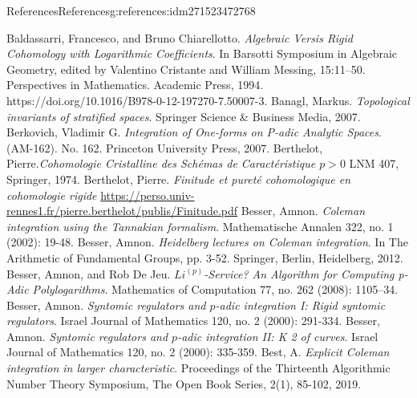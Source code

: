 \documentclass[oneside,10pt,]{book}
\numberwithin{equation}{section}
\newcommand{\gt}{>}
\begin{document}
\begin{references-chapter-numberless}{References}{}{References}{}{}{g:references:idm271523472768}
\begin{thebibliography}{9}
\hypertarget{x:biblio:bib-baldassarri-chiarallotto}{}Baldassarri, Francesco, and Bruno Chiarellotto. \textit{Algebraic Versis Rigid Cohomology with Logarithmic Coefficients}. In Barsotti Symposium in Algebraic Geometry, edited by Valentino Cristante and William Messing, 15:11–50. Perspectives in Mathematics. Academic Press, 1994. https:\slash{}\slash{}doi.org\slash{}10.1016\slash{}B978-0-12-197270-7.50007-3.
\hypertarget{x:biblio:bib-banagl}{}Banagl, Markus. \textit{Topological invariants of stratified spaces}. Springer Science \& Business Media, 2007.
\hypertarget{x:biblio:bib-berkovich}{}Berkovich, Vladimir G.  \textit{Integration of One-forms on P-adic Analytic Spaces}. (AM-162). No. 162. Princeton University Press, 2007.
\hypertarget{x:biblio:bib-berth1}{}Berthelot, Pierre.\textit{Cohomologie Cristalline des Schémas de Caractéristique \(p\gt 0\)} LNM 407, Springer, 1974.
\hypertarget{x:biblio:bib-berth2}{}Berthelot, Pierre.  \textit{Finitude et pureté cohomologique en cohomologie rigide} \url{https://perso.univ-rennes1.fr/pierre.berthelot/publis/Finitude.pdf}
\hypertarget{x:biblio:bib-besser-coleman-tannakian}{}Besser, Amnon. \textit{Coleman integration using the Tannakian formalism}. Mathematische Annalen 322, no. 1 (2002): 19-48.
\hypertarget{x:biblio:bib-besser-coleman-heidelberg}{}Besser, Amnon. \textit{Heidelberg lectures on Coleman integration}. In The Arithmetic of Fundamental Groups, pp. 3-52. Springer, Berlin, Heidelberg, 2012.
\hypertarget{x:biblio:bib-besser-de-jeu}{}Besser, Amnon, and Rob De Jeu. \textit{\(Li^{(p)}\)-Service? An Algorithm for Computing p-Adic Polylogarithms}. Mathematics of Computation 77, no. 262 (2008): 1105–34.
\hypertarget{x:biblio:bib-besser-syntomic-I}{}Besser, Amnon. \textit{Syntomic regulators and \(p\)-adic integration I: Rigid syntomic regulators}. Israel Journal of Mathematics 120, no. 2 (2000): 291-334.
\hypertarget{x:biblio:bib-besser-syntomic-II}{}Besser, Amnon. \textit{Syntomic regulators and \(p\)-adic integration II: K 2 of curves}. Israel Journal of Mathematics 120, no. 2 (2000): 335-359.
\hypertarget{x:biblio:bib-best-coleman-harvey}{}Best, A. \textit{Explicit Coleman integration in larger characteristic}. Proceedings of the Thirteenth Algorithmic Number Theory Symposium, The Open Book Series, 2(1), 85-102, 2019.

\end{thebibliography}
\end{references-chapter-numberless}
\end{document}
